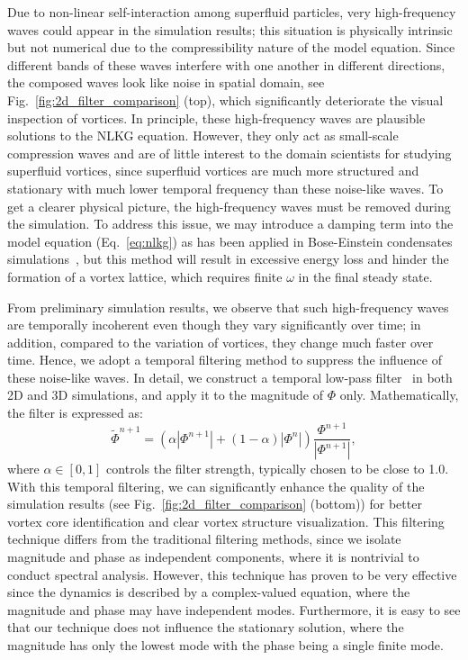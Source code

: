 \documentclass[10pt,journal,compsoc,twoside]{IEEEtran}
\begin{document}
	Due to non-linear self-interaction among superfluid particles, very high-frequency waves could appear in the simulation results; this situation is physically intrinsic but not numerical due to the compressibility nature of the model equation.
	Since different bands of these waves interfere with one another in different directions, the composed waves look like noise in spatial domain, see Fig.~\ref{fig:2d_filter_comparison} (top), which significantly deteriorate the visual inspection of vortices.
	In principle, these high-frequency waves are plausible solutions to the NLKG equation.
	However, they only act as small-scale compression waves and are of little interest to the domain scientists for studying superfluid vortices, since superfluid vortices are much more structured and stationary with much lower temporal frequency than these noise-like waves.
	To get a clearer physical picture, the high-frequency waves must be removed during the simulation.
	To address this issue, we may introduce a damping term into the model equation (Eq.~\ref{eq:nlkg}) as has been applied in Bose-Einstein condensates simulations~\cite{Tsubota_02}, but this method will result in excessive energy loss and hinder the formation of a vortex lattice, which requires finite $\omega$ in the final steady state.
	
	From preliminary simulation results, we observe that such high-frequency waves are temporally incoherent even though they vary significantly over time; in addition, compared to the variation of vortices, they change much faster over time.
	Hence, we adopt a temporal filtering method to suppress the influence of these noise-like waves.
	In detail, we construct a temporal low-pass filter~\cite{OSB_99} in both 2D and 3D simulations, and apply it to the magnitude of $\Phi$ only.
	Mathematically, the filter is expressed as:
	\begin{equation}
		\widetilde{\Phi}^{n+1} = (\alpha |\Phi^{n+1}| + (1 - \alpha) |\Phi^n|) \frac{\Phi^{n+1}}{|\Phi^{n+1}|} ,
	\end{equation}
	where $\alpha\in[0,1]$ controls the filter strength, typically chosen to be close to 1.0.
	With this temporal filtering, we can significantly enhance the quality of the simulation results (see Fig.~\ref{fig:2d_filter_comparison} (bottom)) for better vortex core identification and clear vortex structure visualization. 
	This filtering technique differs from the traditional filtering methods, since we isolate magnitude and phase as independent components, where it is nontrivial to conduct spectral analysis.
	However, this technique has proven to be very effective since the dynamics is described by a complex-valued equation, where the magnitude and phase may have independent modes. 
	Furthermore, it is easy to see that our technique does not influence the stationary solution, where the magnitude has only the lowest mode with the phase being a single finite mode.
	
\end{document}
